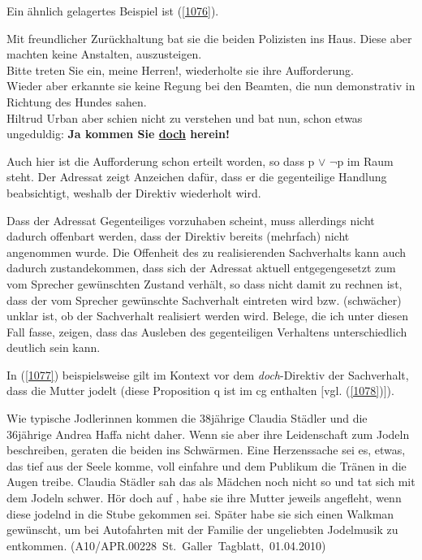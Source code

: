 {Ein ähnlich gelagertes Beispiel ist (\ref{1076}).

\begin{exe}
	\ex\label{1076} 
	\scriptsize
	Mit freundlicher Zurückhaltung bat sie die beiden Polizisten ins Haus. Diese aber machten keine Anstalten, auszusteigen.\\
	\glqq Bitte treten Sie ein, meine Herren!\grqq{}, wiederholte sie ihre Aufforderung.\\
	Wieder aber erkannte sie keine Regung bei den Beamten, die nun demonstrativ in Richtung des Hundes sahen.\\
	Hiltrud Urban aber schien nicht zu verstehen und bat nun, schon etwas ungeduldig: \glqq \textbf{Ja kommen Sie \underline{doch} herein!}\grqq{} 		
	\hfill\hbox {\citet[221]{Kluepfel2012}}
\end{exe}
Auch hier ist die Aufforderung schon erteilt worden, so dass p $\vee$ $\neg$p im Raum steht. Der Adressat zeigt Anzeichen dafür, dass er die gegenteilige Handlung beabsichtigt, weshalb der Direktiv wiederholt wird.

Dass der Adressat Gegenteiliges vorzuhaben scheint, muss allerdings nicht dadurch offenbart werden, dass der Direktiv bereits (mehrfach) nicht angenommen wurde. Die Offenheit des zu realisierenden Sachverhalts kann auch dadurch zustandekommen, dass sich der Adressat aktuell entgegengesetzt zum vom Spre\-cher gewünschten Zustand verhält, so dass nicht damit zu rechnen ist, dass der vom Sprecher gewünschte Sachverhalt eintreten wird bzw. (schwächer) unklar ist, ob der Sachverhalt realisiert werden wird. Belege, die ich unter diesen Fall fasse, zeigen, dass das Ausleben des gegenteiligen Verhaltens unterschiedlich deutlich sein kann.

In (\ref{1077}) beispielsweise gilt im Kontext vor dem \textit{doch}-Direktiv der Sachverhalt, dass die Mutter jodelt (diese Proposition q ist im cg enthalten $[$vgl. (\ref{1078})$]$).
		
\begin{exe}
	\ex\label{1077} 
	\scriptsize
	Wie typische Jodlerinnen kommen die 38jährige Claudia Städler und die 36jährige Andrea Haffa nicht daher. Wenn sie aber ihre Leidenschaft zum Jodeln 		beschreiben, geraten die beiden ins Schwärmen. Eine Herzenssache sei es, etwas, das tief aus der Seele komme, \glqq voll einfahre\grqq{} und dem 			Publikum die Tränen in die Augen treibe. Claudia Städler sah das als Mädchen noch nicht so und tat sich mit dem Jodeln schwer. \glqq Hör doch auf			\grqq{}, habe sie ihre Mutter jeweils angefleht, wenn diese jodelnd in die Stube gekommen sei. Später habe sie sich einen Walkman gewünscht, um bei 		Autofahrten mit der Familie der ungeliebten Jodelmusik zu entkommen.		
	\hfill\hbox {(A10/APR.00228 St. Galler Tagblatt, 01.04.2010)}
\end{exe}		
 	    
}
